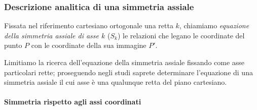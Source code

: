 \subsubsection{\textbf{Descrizione analitica di una simmetria assiale}}

\begin{definizione}
  Fissata nel riferimento cartesiano ortogonale una retta \(k\), 
  chiamiamo \emph{equazione della simmetria assiale di asse \(k\)} (\(S_k\)) 
  le relazioni che legano le coordinate del punto \(P\) con le coordinate 
  della sua immagine \(P'\).
\end{definizione}

Limitiamo la ricerca dell'equazione della simmetria assiale fissando 
come asse particolari rette; proseguendo negli studi saprete 
determinare l'equazione di una simmetria assiale il cui asse è una 
qualunque retta del piano cartesiano.

\paragraph{Simmetria rispetto agli assi coordinati}
~

